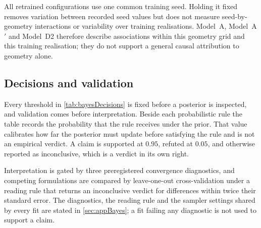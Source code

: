 All retrained configurations use one common training seed. Holding it fixed removes variation between recorded seed values but does not measure seed-by-geometry interactions or variability over training realisations. Model~A, Model~A$'$ and Model~D2 therefore describe associations within this geometry grid and this training realisation; they do not support a general causal attribution to geometry alone.

\subsection{Decisions and validation}

Every threshold in \autoref{tab:bayesDecisions} is fixed before a posterior is inspected, and validation comes before interpretation. Beside each probabilistic rule the table records the probability that the rule receives under the prior. That value calibrates how far the posterior must update before satisfying the rule and is not an empirical verdict. A claim is supported at $0.95$, refuted at $0.05$, and otherwise reported as inconclusive, which is a verdict in its own right.



Interpretation is gated by three preregistered convergence diagnostics, and competing formulations are compared by leave-one-out cross-validation under a reading rule that returns an inconclusive verdict for differences within twice their standard error. The diagnostics, the reading rule and the sampler settings shared by every fit are stated in \autoref{sec:appBayes}; a fit failing any diagnostic is not used to support a claim.
